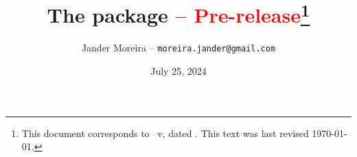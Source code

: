 \documentclass[a4paper, 11pt]{article}
\title{%
    The \PackageName{palettize} package \textcolor{red}{ -- Pre-release}\thanks{This document corresponds to \PackageName{palettize}~v\PLTVersion, dated \PLTDate.
    This text was last revised \today.}%
}
\author{Jander Moreira -- \texttt{moreira.jander@gmail.com}}
\date{July 25, 2024}
\begin{document}
\maketitle
\sloppy

%
%
%
%
%
%
%
%
%
%
%
%
%
%
%
%
\end{document}

